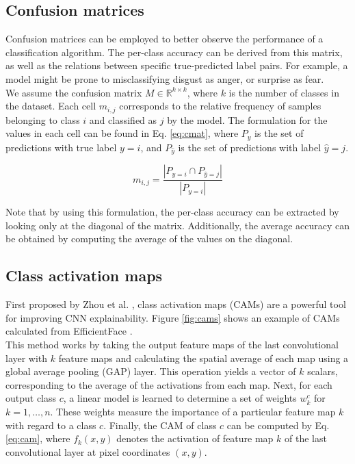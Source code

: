 \documentclass[../main.tex]{subfiles}
\begin{document}
\subsection{Confusion matrices}

Confusion matrices can be employed to better observe the performance of a classification algorithm. 
The per-class accuracy can be derived from this matrix, as well as the relations between specific true-predicted label pairs. 
For example, a model might be prone to misclassifying disgust as anger, or surprise as fear.\\

We assume the confusion matrix $M \in \mathbb{R}^{k \times k}$, where $k$ is the number of classes in the dataset. 
Each cell $m_{i,j}$ corresponds to the relative frequency of samples belonging to class $i$ and classified as $j$ by the model. 
The formulation for the values in each cell can be found in Eq. \ref{eq:cmat}, where $P_y$ is the set of predictions with true label $y = i$, and $P_{\hat{y}}$ is the set of predictions with label $\hat{y} = j$.

\begin{equation} \label{eq:cmat}
    m_{i,j} = \frac{|P_{y=i} \cap P_{\hat{y}=j}|}{|P_{y=i}|}
\end{equation}

Note that by using this formulation, the per-class accuracy can be extracted by looking only at the diagonal of the matrix. 
Additionally, the average accuracy can be obtained by computing the average of the values on the diagonal.

\subsection{Class activation maps}

First proposed by Zhou et al. \cite{cams2016}, class activation maps (CAMs) are a powerful tool for improving CNN explainability. 
Figure \ref{fig:cams} shows an example of CAMs calculated from EfficientFace \cite{eff-face2021}.\\

This method works by taking the output feature maps of the last convolutional layer with $k$ feature maps and calculating the spatial average of each map using a global average pooling (GAP) layer. 
This operation yields a vector of $k$ scalars, corresponding to the average of the activations from each map.
Next, for each output class $c$, a linear model is learned to determine a set of weights $w^c_k$ for $k = 1, \ldots, n$. 
These weights measure the importance of a particular feature map $k$ with regard to a class $c$. 
Finally, the CAM of class $c$ can be computed by Eq. \ref{eq:cam}, where  $f_k(x,y)$ denotes the activation of feature map $k$ of the last convolutional layer at pixel coordinates $(x,y)$.
\end{document}
